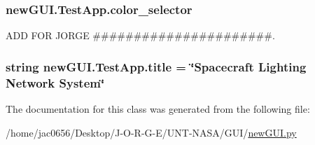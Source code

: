 \subsubsection[{\texorpdfstring{color\+\_\+selector}{color_selector}}]{\setlength{\rightskip}{0pt plus 5cm}new\+G\+U\+I.\+Test\+App.\+color\+\_\+selector}\hypertarget{classnewGUI_1_1TestApp_a2ec34efdee2b3a0849aea4e05425ee50}{}\label{classnewGUI_1_1TestApp_a2ec34efdee2b3a0849aea4e05425ee50}


A\+DD F\+OR J\+O\+R\+GE \#\#\#\#\#\#\#\#\#\#\#\#\#\#\#\#\#\#\#\#\#\#. 

\subsubsection[{\texorpdfstring{title}{title}}]{\setlength{\rightskip}{0pt plus 5cm}string new\+G\+U\+I.\+Test\+App.\+title = \char`\"{}Spacecraft Lighting Network System\char`\"{}\hspace{0.3cm}{\ttfamily [static]}}\hypertarget{classnewGUI_1_1TestApp_ae44cfc2da1e8c41a94ff04501564b731}{}\label{classnewGUI_1_1TestApp_ae44cfc2da1e8c41a94ff04501564b731}


The documentation for this class was generated from the following file\+:\begin{DoxyCompactItemize}
\item 
/home/jac0656/\+Desktop/\+J-\/\+O-\/\+R-\/\+G-\/\+E/\+U\+N\+T-\/\+N\+A\+S\+A/\+G\+U\+I/\hyperlink{newGUI_8py}{new\+G\+U\+I.\+py}\end{DoxyCompactItemize}
